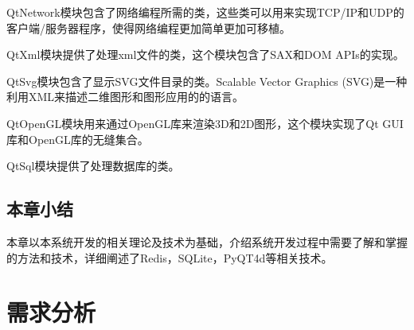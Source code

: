 \documentclass{zjutthesis}
\begin{document}
QtNetwork模块包含了网络编程所需的类，这些类可以用来实现TCP/IP和UDP的客户端/服务器程序，使得网络编程更加简单更加可移植。

QtXml模块提供了处理xml文件的类，这个模块包含了SAX和DOM APIs的实现。

QtSvg模块包含了显示SVG文件目录的类。Scalable Vector Graphics (SVG)是一种利用XML来描述二维图形和图形应用的的语言。

QtOpenGL模块用来通过OpenGL库来渲染3D和2D图形，这个模块实现了Qt GUI库和OpenGL库的无缝集合。

QtSql模块提供了处理数据库的类。

\section{本章小结}
本章以本系统开发的相关理论及技术为基础，介绍系统开发过程中需要了解和掌握的方法和技术，详细阐述了Redis，SQLite，PyQT4d等相关技术。


\chapter{需求分析}
\end{document}
